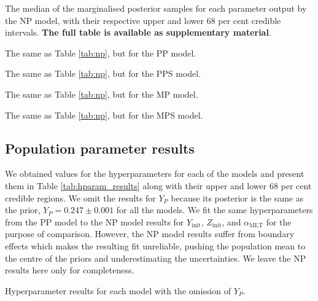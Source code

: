 \documentclass[fleqn,usenatbib]{mnras}
\newcommand{\mlt}{\ensuremath{{\alpha_\mathrm{MLT}}}}
\begin{document}
\begin{table}
	\centering
	\caption{The median of the marginalised posterior samples for each parameter output by the NP model, with their respective upper and lower 68 per cent credible intervals. \textbf{\color{red} The full table is available as supplementary material}.}
	\label{tab:np}
	
\end{table}

\begin{table}
	\centering
	\caption{The same as Table \ref{tab:np}, but for the PP model.}
	\label{tab:pp}
	
\end{table}

\begin{table}
	\centering
	\caption{The same as Table \ref{tab:np}, but for the PPS model.}
	\label{tab:pps}
	
\end{table}

\begin{table}
	\centering
	\caption{The same as Table \ref{tab:np}, but for the MP model.}
	\label{tab:mp}
	
\end{table}

\begin{table}
	\centering
	\caption{The same as Table \ref{tab:np}, but for the MPS model.}
	\label{tab:mps}
	
\end{table}

\subsection{Population parameter results}\label{sec:hparam-results}

We obtained values for the hyperparameters for each of the models and present them in Table \ref{tab:hparam_results} along with their upper and lower 68 per cent credible regions. We omit the results for $Y_P$ because its posterior is the same as the prior, $Y_P=0.247\pm0.001$ for all the models. We fit the same hyperparameters from the PP model to the NP model results for $Y_\mathrm{init}$, $Z_\mathrm{init}$, and $\mlt$ for the purpose of comparison. However, the NP model results suffer from boundary effects which makes the resulting fit unreliable, pushing the population mean to the centre of the priors and underestimating the uncertainties. We leave the NP results here only for completeness.

\begin{table}
	\centering
	\caption{Hyperparameter results for each model with the omission of $Y_P$.}
	\label{tab:hparam_results}
	
\end{table}
\end{document}

